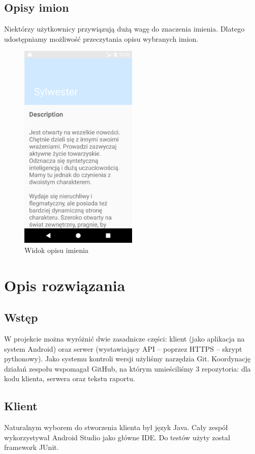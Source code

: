 \documentclass[12pt,a4paper]{article}
\begin{document}
\subsection{Opisy imion}
Niektórzy użytkownicy przywiązują dużą wagę do znaczenia imienia.
Dlatego udostępniamy możliwość przeczytania opisu wybranych imion.

\begin{figure}[h]
    \caption{Widok opisu imienia}
    \centering
    \includegraphics[width=0.5\textwidth]{name_description}
\end{figure}

\section{Opis rozwiązania}
\subsection{Wstęp}

W projekcie można wyróżnić dwie zasadnicze części: klient (jako aplikacja na system Android) oraz serwer (wystawiający API -- poprzez HTTPS -- skrypt pythonowy).
Jako systemu kontroli wersji użyliśmy narzędzia Git.
Koordynację działań zespołu wspomagał GitHub, na którym umieściliśmy 3 repozytoria: dla kodu klienta, serwera oraz tekstu raportu.

\subsection{Klient}
Naturalnym wyborem do stworzenia klienta był język Java.
Cały zespół wykorzystywał Android Studio jako główne IDE.
Do testów użyty został framework JUnit.
\end{document}
